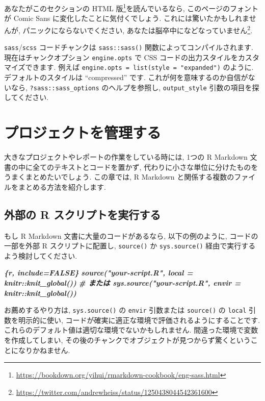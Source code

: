 \documentclass[
  11pt,
  lualatex,ja=standard,jafont=noto]{bxjsreport}
\newenvironment{Shaded}{\begin{snugshade}}{\end{snugshade}}
\newcommand{\InformationTok}[1]{\textcolor[rgb]{0.56,0.35,0.01}{\textbf{\textit{#1}}}}
\renewcommand{\href}[2]{#2\footnote{\url{#1}}}
\begin{document}
あなたが\href{https://bookdown.org/yihui/rmarkdown-cookbook/eng-sass.html}{このセクションの HTML 版}を読んでいるなら, このページのフォントが Comic Sans に変化したことに気付くでしょう. これには驚いたかもしれませんが, パニックにならないでください, \href{https://twitter.com/andrewheiss/status/1250438044542361600}{あなたは脳卒中になどなっていません}.

\texttt{sass}/\texttt{scss} コードチャンクは \texttt{sass::sass()} 関数によってコンパイルされます. 現在はチャンクオプション \texttt{engine.opts} で CSS コードの出力スタイルをカスタマイズできます. 例えば \texttt{engine.opts = list(style = "expanded")} のように. デフォルトのスタイルは ``compressed'' です. これが何を意味するのか自信がないなら, \texttt{?sass::sass\_options} のヘルプを参照し, \texttt{output\_style} 引数の項目を探してください.

\hypertarget{managing-projects}{%
\chapter{プロジェクトを管理する}\label{managing-projects}}

大きなプロジェクトやレポートの作業をしている時には, 1つの R Markdown 文書の中に全てのテキストとコードを置かず, 代わりに小さな単位に分けたものをうまくまとめたいでしょう. この章では, R Markdown と関係する複数のファイルをまとめる方法を紹介します.

\hypertarget{source-script}{%
\section{外部の R スクリプトを実行する}\label{source-script}}

もし R Markdown 文書に大量のコードがあるなら, 以下の例のように, コードの一部を外部 R スクリプトに配置し, \texttt{source()} か \texttt{sys.source()} 経由で実行するよう検討してください.

\begin{Shaded}
\begin{Highlighting}[]
\InformationTok{\textasciigrave{}\textasciigrave{}\textasciigrave{}\{r, include=FALSE\}}
\InformationTok{source("your{-}script.R", local = knitr::knit\_global())}
\InformationTok{\# または sys.source("your{-}script.R", envir = knitr::knit\_global())}
\InformationTok{\textasciigrave{}\textasciigrave{}\textasciigrave{}}
\end{Highlighting}
\end{Shaded}

お薦めするやり方は, \texttt{sys.source()} の \texttt{envir} 引数または \texttt{source()} の \texttt{local} 引数を明示的に使い, コードが確実に適正な環境で評価されるようにすることです. これらのデフォルト値は適切な環境でないかもしれません. 間違った環境で変数を作成してしまい, その後のチャンクでオブジェクトが見つからず驚くということになりかねません.
\end{document}

